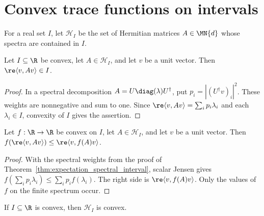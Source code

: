 \section{Convex trace functions on intervals}

\begin{definition}\label{def:hermitian_spectral_domain}
    \leanok
    For a real set $I$, let $\mathcal H_I$ be the set of Hermitian matrices
    $A\in\MN{d}$ whose spectra are contained in $I$.
\end{definition}

\begin{theorem}%
    \label{thm:expectation_spectral_interval}
    \leanok
    Let $I\subseteq\R$ be convex, let $A\in\mathcal H_I$, and let $v$ be a
    unit vector. Then $\re\langle v,Av\rangle\in I$.
\end{theorem}

\begin{proof}\leanok
    In a spectral decomposition $A=U\diag(\lambda)U^\dagger$, put
    $p_i=|(U^\dagger v)_i|^2$. These weights are nonnegative and sum to one.
    Since $\re\langle v,Av\rangle=\sum_i p_i\lambda_i$ and each
    $\lambda_i\in I$, convexity of $I$ gives the assertion.
\end{proof}

\begin{theorem}%
    \label{thm:diagonal_jensen_interval}
    \leanok
    Let $f:\R\to\R$ be convex on $I$, let $A\in\mathcal H_I$, and let
    $v$ be a unit vector. Then
    $f(\re\langle v,Av\rangle)\le\re\langle v,f(A)v\rangle$.
\end{theorem}

\begin{proof}\leanok
    With the spectral weights from the proof of
    Theorem~\ref{thm:expectation_spectral_interval}, scalar Jensen gives
    $f(\sum_i p_i\lambda_i)\le\sum_i p_i f(\lambda_i)$.
    The right side is $\re\langle v,f(A)v\rangle$.
    Only the values of $f$ on the finite spectrum occur.
\end{proof}

\begin{theorem}%
    \label{thm:convex_hermitian_spectral_domain}
    \leanok
    If $I\subseteq\R$ is convex, then $\mathcal H_I$ is convex.
\end{theorem}

